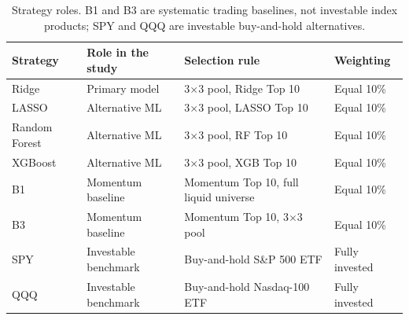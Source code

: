 \begin{table}[H]
\centering
\footnotesize
\begin{tabular}{p{2.2cm}p{3.4cm}p{5.8cm}p{2.6cm}}
\toprule
Strategy & Role in the study & Selection rule & Weighting \\
\midrule
Ridge & Primary model & 3$\times$3 pool, Ridge Top 10 & Equal 10\% \\
LASSO & Alternative ML & 3$\times$3 pool, LASSO Top 10 & Equal 10\% \\
Random Forest & Alternative ML & 3$\times$3 pool, RF Top 10 & Equal 10\% \\
XGBoost & Alternative ML & 3$\times$3 pool, XGB Top 10 & Equal 10\% \\
B1 & Momentum baseline & Momentum Top 10, full liquid universe & Equal 10\% \\
B3 & Momentum baseline & Momentum Top 10, 3$\times$3 pool & Equal 10\% \\
SPY & Investable benchmark & Buy-and-hold S\&P 500 ETF & Fully invested \\
QQQ & Investable benchmark & Buy-and-hold Nasdaq-100 ETF & Fully invested \\
\bottomrule
\end{tabular}
\caption{Strategy roles. B1 and B3 are systematic trading baselines, not investable index products; SPY and QQQ are investable buy-and-hold alternatives.}
\label{tab:strategies}
\end{table}
